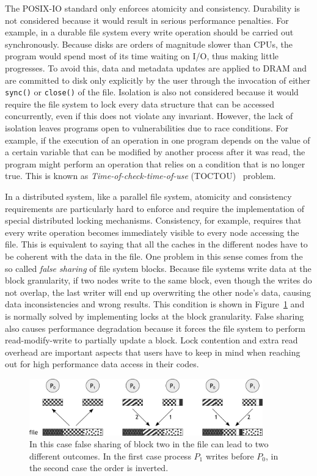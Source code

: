 The POSIX-IO standard only enforces atomicity and consistency. Durability is not considered because it would result in serious performance penalties. For example, in a durable file system every write operation should be
carried out synchronously. Because disks are orders of magnitude slower than CPUs, the program would spend most of its time waiting on I/O, thus making little progresses. To avoid this, data and metadata updates are 
applied to DRAM and are committed to disk only explicitly by the user through the invocation of either \texttt{sync()} or \texttt{close()} of the file. Isolation is also not considered because it would require the file 
system to lock every data structure that can be accessed concurrently, even if this does not violate any invariant. However, the lack of isolation leaves programs open to vulnerabilities due to race conditions. For example, 
if the execution of an operation in one program depends on the value of a certain variable that can be modified by another process after it was read, the program might perform an operation that relies on a condition that 
is no longer true. This is known as \textit{Time-of-check-time-of-use} (TOCTOU)~\cite{Wright2007} problem.

In a distributed system, like a parallel file system, atomicity and consistency requirements are particularly hard to enforce and require the implementation of special distributed locking mechanisms. Consistency, for
example, requires that every write operation becomes immediately visible to every node accessing the file. This is equivalent to saying that all the caches in the different nodes have to be coherent with the data in the 
file. One problem in this sense comes from the so called \textit{false sharing} of file system blocks. Because file systems write data at the block granularity, if two nodes write to the same block, even though the writes 
do not overlap, the last writer will end up overwriting the other node's data, causing data inconsistencies and wrong results. This condition is shown in Figure~\ref{figure: false-sharing} and is normally solved by 
implementing locks at the block granularity. False sharing also causes performance degradation because it forces the file system to perform read-modify-write to partially update a block. Lock contention and extra read 
overhead are important aspects that users have to keep in mind when reaching out for high performance data access in their codes.

\begin{figure}[!htb]
\centering
\includegraphics[width=0.9\textwidth]{figures/false-sharing}
\caption{In this case false sharing of block two in the file can lead to two different outcomes. In the first case process $P_1$ writes before $P_0$, in the second case the order is inverted.}
\label{figure: false-sharing}
\end{figure}

